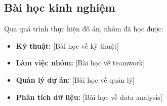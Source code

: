 \subsection{Bài học kinh nghiệm}

Qua quá trình thực hiện đồ án, nhóm đã học được:

\begin{itemize}
    \item \textbf{Kỹ thuật:} [Bài học về kỹ thuật]
    \item \textbf{Làm việc nhóm:} [Bài học về teamwork]
    \item \textbf{Quản lý dự án:} [Bài học về quản lý]
    \item \textbf{Phân tích dữ liệu:} [Bài học về data analysis]
\end{itemize}

\clearpage
